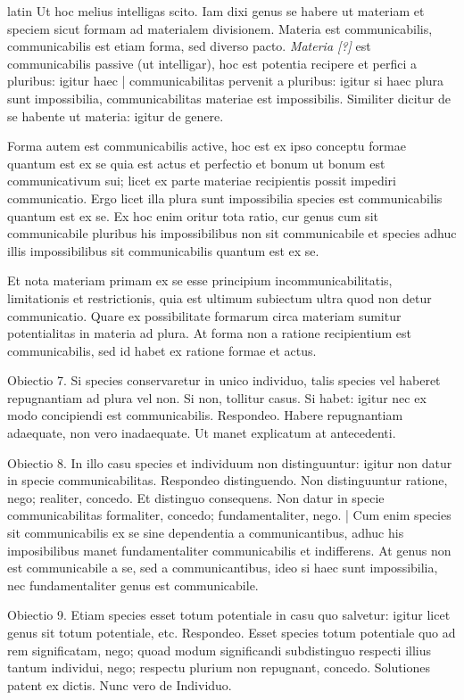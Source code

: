 \begin{otherlanguage*}{latin}
\pstart
Ut hoc melius intelligas scito. Iam dixi genus se habere ut materiam et speciem sicut formam ad materialem divisionem. Materia est communicabilis, communicabilis est etiam forma, sed diverso pacto. \emph{Materia [?]} est communicabilis passive (ut intelligar), hoc est potentia recipere et perfici a pluribus:
igitur haec \textnormal{|} communicabilitas pervenit a pluribus:
igitur si haec plura sunt impossibilia, communicabilitas materiae est impossibilis. Similiter dicitur de se habente ut materia:
igitur de genere. 
\pend

\pstart
Forma autem est communicabilis active, hoc est ex ipso conceptu formae quantum est ex se quia est actus et perfectio et bonum ut bonum est communicativum sui; licet ex parte materiae recipientis possit impediri communicatio. Ergo licet illa plura sunt impossibilia species est communicabilis quantum est ex se. Ex hoc enim oritur tota ratio, cur genus cum sit communicabile pluribus his impossibilibus non sit communicabile et species adhuc illis impossibilibus sit communicabilis quantum est ex se. 
\pend

\pstart
Et nota materiam primam ex se esse principium incommunicabilitatis, limitationis et restrictionis, quia est ultimum subiectum ultra quod non detur communicatio. Quare ex possibilitate formarum circa materiam sumitur potentialitas in materia ad plura. At forma non a ratione recipientium est communicabilis, sed id habet ex ratione formae et actus. 
\pend

\pstart
Obiectio 7. Si species conservaretur in unico individuo, talis species vel haberet repugnantiam ad plura vel non. Si non, tollitur casus. Si habet:
igitur nec ex modo concipiendi est communicabilis. Respondeo. Habere repugnantiam adaequate, non vero inadaequate. Ut manet explicatum at antecedenti. 
\pend

\pstart
Obiectio 8. In illo casu species et individuum non distinguuntur:
igitur non datur in specie communicabilitas. Respondeo distinguendo. Non distinguuntur ratione, nego; realiter, concedo. Et distinguo consequens. Non datur in specie communicabilitas formaliter, concedo; fundamentaliter, nego. \textnormal{|} Cum enim species sit communicabilis ex se sine dependentia a communicantibus, adhuc his imposibilibus manet fundamentaliter communicabilis et indifferens. At genus non est communicabile a se, sed a communicantibus, ideo si haec sunt impossibilia, nec fundamentaliter genus est communicabile. 
\pend

\pstart
Obiectio 9. Etiam species esset totum potentiale in casu quo salvetur:
igitur licet genus sit totum potentiale, etc. Respondeo. Esset species totum potentiale quo ad rem significatam, nego; quoad modum significandi subdistinguo respecti illius tantum individui, nego; respectu plurium non repugnant, concedo. Solutiones patent ex dictis. Nunc vero de Individuo. 
\pend


\end{otherlanguage*}
